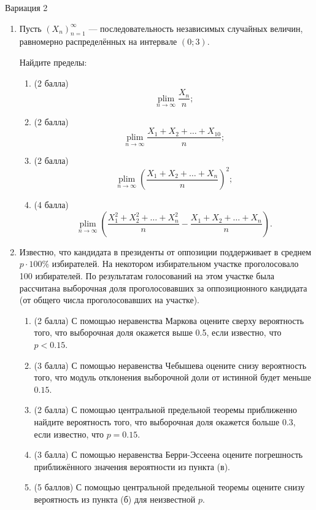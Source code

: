 \documentclass[12pt]{article}
\DeclareMathOperator*{\plim}{plim}
\begin{document}
\newpage


Вариация 2

\begin{enumerate}
\item Пусть $(X_n)_{n=1}^{\infty}$ — последовательность независимых случайных величин, 
равномерно распределённых на интервале $(0; 3)$. 


Найдите пределы:

\begin{enumerate}
    \item (2 балла) 
    \[
        \plim\limits_{n\to\infty} \frac{X_n}{n};
    \]
    \item (2 балла) 
    \[ 
        \plim\limits_{n\to\infty} \frac{X_1 + X_2 + \ldots + X_{10}}{n};
    \]
    \item (2 балла) 
    \[
         \plim\limits_{n\to\infty} \left(\frac{X_1 + X_2 + \ldots + X_n}{n}\right)^2;
         \]
    
    \item (4 балла) 
    \[
         \plim\limits_{n\to\infty} \left(\frac{X_1^2 + X_2^2 + \ldots + X_{n}^2}{n} - \frac{X_1 + X_2 + \ldots + X_{n}}{n}\right).
         \]
\end{enumerate}

\item Известно, что кандидата в президенты от оппозиции поддерживает в среднем $p\cdot 100\%$ избирателей. 
На некотором избирательном участке проголосовало 100 избирателей. 
По результатам голосований на этом участке была рассчитана выборочная доля проголосовавших 
за оппозиционного кандидата (от общего числа проголосовавших на участке).

\begin{enumerate}
    \item (2 балла) С помощью неравенства Маркова оцените сверху вероятность того, 
    что выборочная доля окажется выше 0.5, если известно, что $p<0.15$.
    \item (3 балла) С помощью неравенства Чебышева оцените снизу вероятность того, 
    что модуль отклонения выборочной доли от истинной будет меньше $0.15$.
    \item (2 балла) С помощью центральной предельной теоремы приближенно найдите вероятность того, 
    что выборочная доля окажется больше 0.3, если известно, что $p=0.15$.
    \item (3 балла) С помощью неравенства Берри-Эссеена оцените погрешность приближённого значения вероятности из пункта (в).
    \item (5 баллов) С помощью центральной предельной теоремы оцените снизу вероятность из пункта (б) для неизвестной $p$.
\end{enumerate}

\end{enumerate}
\end{document}

